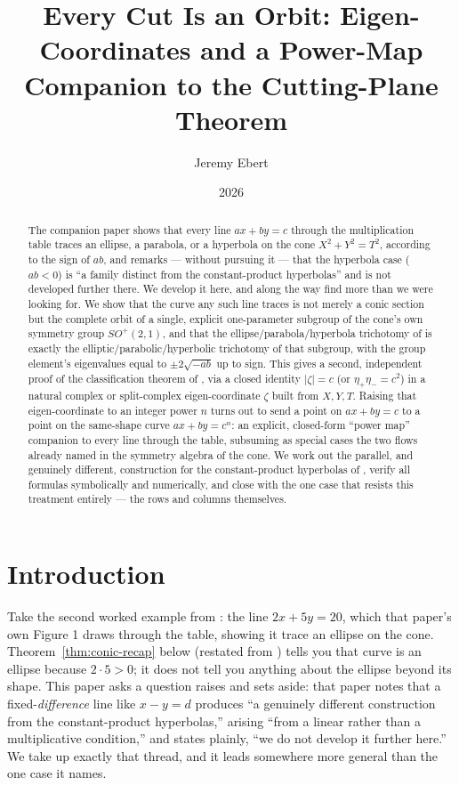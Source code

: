\documentclass[11pt]{amsart}
\title{Every Cut Is an Orbit: Eigen-Coordinates and a Power-Map Companion to the Cutting-Plane Theorem}
\author{Jeremy Ebert}
\date{2026}
\theoremstyle{remark}
\begin{document}
\maketitle

\begin{abstract}
The companion paper \cite{Ebert2026Table} shows that every line $ax+by=c$ through the multiplication table traces an ellipse, a parabola, or a hyperbola on the cone $X^2+Y^2=T^2$, according to the sign of $ab$, and remarks --- without pursuing it --- that the hyperbola case ($ab<0$) is ``a family distinct from the constant-product hyperbolas'' and is not developed further there. We develop it here, and along the way find more than we were looking for. We show that the curve any such line traces is not merely a conic section but the complete orbit of a single, explicit one-parameter subgroup of the cone's own symmetry group $SO^+(2,1)$, and that the ellipse/parabola/hyperbola trichotomy of \cite{Ebert2026Table} is exactly the elliptic/parabolic/hyperbolic trichotomy of that subgroup, with the group element's eigenvalues equal to $\pm2\sqrt{-ab}$ up to sign. This gives a second, independent proof of the classification theorem of \cite{Ebert2026Table}, via a closed identity $|\zeta|=c$ (or $\eta_+\eta_-=c^2$) in a natural complex or split-complex eigen-coordinate $\zeta$ built from $X,Y,T$. Raising that eigen-coordinate to an integer power $n$ turns out to send a point on $ax+by=c$ to a point on the same-shape curve $ax+by=c^n$: an explicit, closed-form ``power map'' companion to every line through the table, subsuming as special cases the two flows already named in the symmetry algebra of the cone. We work out the parallel, and genuinely different, construction for the constant-product hyperbolas of \cite{Ebert2026Table}, verify all formulas symbolically and numerically, and close with the one case that resists this treatment entirely --- the rows and columns themselves.
\end{abstract}

\section{Introduction}

Take the second worked example from \cite{Ebert2026Table}: the line $2x+5y=20$, which that paper's own Figure 1 draws through the table, showing it trace an ellipse on the cone. Theorem~\ref{thm:conic-recap} below (restated from \cite{Ebert2026Table}) tells you that curve is an ellipse because $2\cdot5>0$; it does not tell you anything about the ellipse beyond its shape. This paper asks a question \cite{Ebert2026Table} raises and sets aside: that paper notes that a fixed-\emph{difference} line like $x-y=d$ produces ``a genuinely different construction from the constant-product hyperbolas,'' arising ``from a linear rather than a multiplicative condition,'' and states plainly, ``we do not develop it further here.'' We take up exactly that thread, and it leads somewhere more general than the one case it names.
\end{document}
